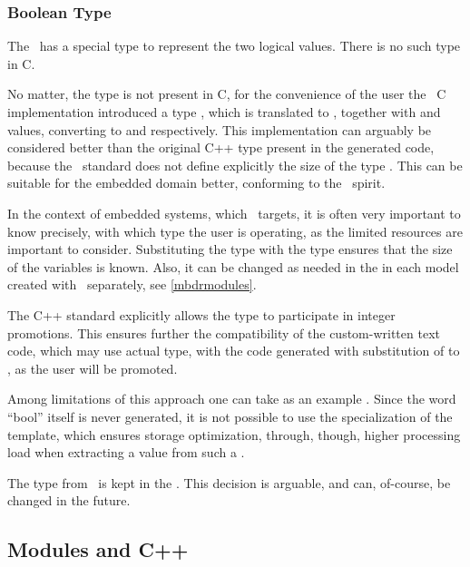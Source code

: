 \subsubsection{Boolean Type}

The \cpppl\ has a special  type to represent the two logical values. There is no such type in C.

No matter, the  type is not present in C, for the convenience of the user the \mb\ C implementation introduced a type ,
which is translated to , together with  and  values, converting to  and  respectively.
This implementation can arguably be considered better than the original C++  type present in the generated code, because the \cpppl\ standard
does not define explicitly the size of the  type \cite{cpp11}. This can be suitable for the embedded domain better, conforming to the
\mbdr\ spirit.

In the context of embedded systems, which \mbdr\ targets, it is often very important to 
know precisely, with which type the user is operating, as the limited resources
are important to consider. Substituting the  type with the  type ensures that the size of 
the  variables is known. Also, it can be changed as needed in the 
 in each model created with \mb\ separately, see \ref{mbdrmodules}.

The C++ standard explicitly allows the  type to participate in integer promotions. 
This ensures further the compatibility of the custom-written text code, which may use actual 
 type, with the code generated with substitution of  to , 
as the user  will be promoted.

Among limitations of this approach one can take as an example . 
Since the word ``bool'' itself is never generated, it is not possible to use the specialization 
of the template, which ensures storage optimization, through, though, higher processing load when
extracting a value from such a .

The  type from \mbdr\ is kept in the \pcpp. This decision is arguable, and can, of-course, be
changed in the future.

\subsection{Modules and C++}

